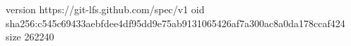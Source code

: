 version https://git-lfs.github.com/spec/v1
oid sha256:c545c69433aebfdee4df95dd9e75ab9131065426af7a300ac8a0da178ccaf424
size 262240
